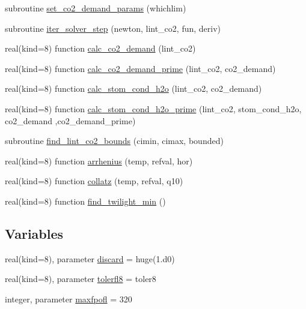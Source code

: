 \begin{DoxyCompactItemize}
\item 
subroutine \hyperlink{namespacefarq__leuning_a7a8d111e1aa61a24fdbd7e96f67967e0}{set\+\_\+co2\+\_\+demand\+\_\+params} (whichlim)
\item 
subroutine \hyperlink{namespacefarq__leuning_a0aaa5d6b54e5a9a9549d2c43bfbecf06}{iter\+\_\+solver\+\_\+step} (newton, lint\+\_\+co2, fun, deriv)
\item 
real(kind=8) function \hyperlink{namespacefarq__leuning_adcca2c24ca270f8fc0509c5e71906eff}{calc\+\_\+co2\+\_\+demand} (lint\+\_\+co2)
\item 
real(kind=8) function \hyperlink{namespacefarq__leuning_a4ea88f530f197b5a15c695c83e15e1a1}{calc\+\_\+co2\+\_\+demand\+\_\+prime} (lint\+\_\+co2, co2\+\_\+demand)
\item 
real(kind=8) function \hyperlink{namespacefarq__leuning_ae3bd8aaff5c63ef30cb1004d8a5c9639}{calc\+\_\+stom\+\_\+cond\+\_\+h2o} (lint\+\_\+co2, co2\+\_\+demand)
\item 
real(kind=8) function \hyperlink{namespacefarq__leuning_a08bfe77c4f0f53d4e8973f289ebbba77}{calc\+\_\+stom\+\_\+cond\+\_\+h2o\+\_\+prime} (lint\+\_\+co2, stom\+\_\+cond\+\_\+h2o, co2\+\_\+demand                                                                                                                                                                                                                           ,co2\+\_\+demand\+\_\+prime)
\item 
subroutine \hyperlink{namespacefarq__leuning_a7f904e78bc57baa0ad78b38d7455e710}{find\+\_\+lint\+\_\+co2\+\_\+bounds} (cimin, cimax, bounded)
\item 
real(kind=8) function \hyperlink{namespacefarq__leuning_a6d031c781aa0a5b3a55dd340813a2c33}{arrhenius} (temp, refval, hor)
\item 
real(kind=8) function \hyperlink{namespacefarq__leuning_ab284bec4bd11bda7c190c6ae2de979fb}{collatz} (temp, refval, q10)
\item 
real(kind=8) function \hyperlink{namespacefarq__leuning_a2a73acc8f131feea39acb9830fadc1cc}{find\+\_\+twilight\+\_\+min} ()
\end{DoxyCompactItemize}
\subsection*{Variables}
\begin{DoxyCompactItemize}
\item 
real(kind=8), parameter \hyperlink{namespacefarq__leuning_a31a2c362c8646a0912470a61a19135b2}{discard} = huge(1.d0)
\item 
real(kind=8), parameter \hyperlink{namespacefarq__leuning_a544a9b3986d12bf60c748eff03f49665}{tolerfl8} = toler8
\item 
integer, parameter \hyperlink{namespacefarq__leuning_ae18ccfcc4ad61a2d80f126c65258fffd}{maxfpofl} = 320
\end{DoxyCompactItemize}


